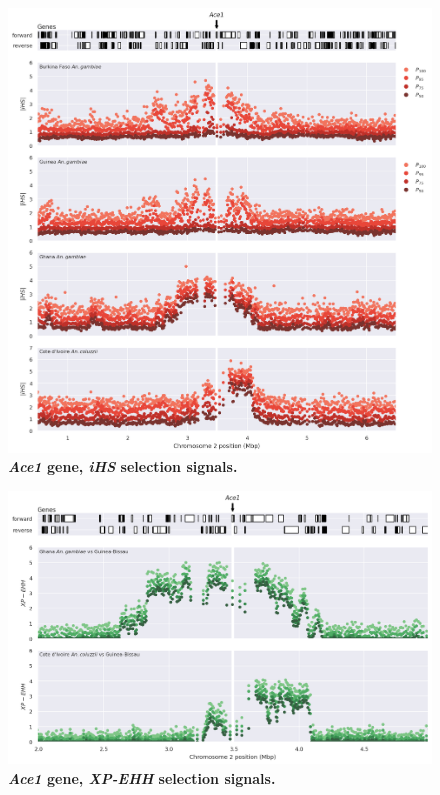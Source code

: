 \documentclass[a4paper,11pt,abstracton,hidelinks]{scrartcl}
\begin{document}
\begin{figure}[t!]
	\begin{center}
		\includegraphics*[width=1.1\linewidth,center]{artwork/locus_ace1_ihs.png}
	\end{center}
	\caption[\textit{Ace1} gene, \textit{iHS} selection signals]{
	\textbf{\textit{Ace1} gene, \textit{iHS} selection signals.}
	} 
	\label{fig:locus_ace1_ihs}
\end{figure}


\clearpage


\begin{figure}[t!]
	\begin{center}
		\includegraphics*[width=1.1\linewidth,center]{artwork/locus_ace1_xpehh.png}
	\end{center}
	\caption[\textit{Ace1} gene, \textit{XP-EHH} selection signals]{
	\textbf{\textit{Ace1} gene, \textit{XP-EHH} selection signals.}
	} 
	\label{fig:locus_ace1_xpehh}
\end{figure}
\end{document}
